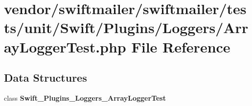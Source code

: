 \section{vendor/swiftmailer/swiftmailer/tests/unit/\+Swift/\+Plugins/\+Loggers/\+Array\+Logger\+Test.php File Reference}
\label{_array_logger_test_8php}
\subsection*{Data Structures}
\begin{DoxyCompactItemize}
\item 
class {\bf Swift\+\_\+\+Plugins\+\_\+\+Loggers\+\_\+\+Array\+Logger\+Test}
\end{DoxyCompactItemize}
